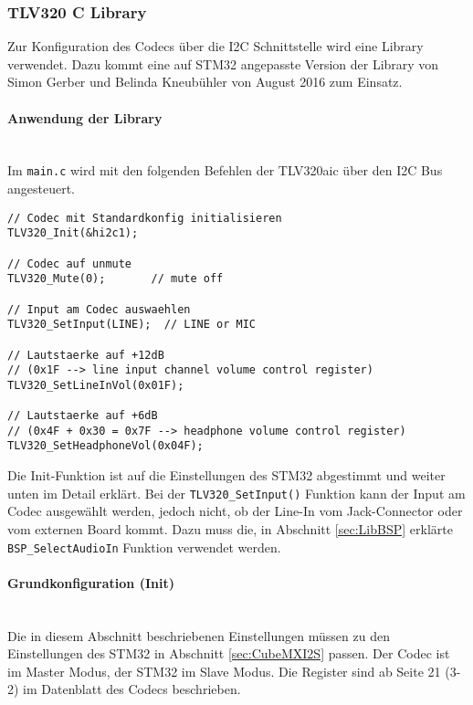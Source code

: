 \subsubsection{TLV320 C Library}
\label{sec:Library_tlv320}

Zur Konfiguration des Codecs über die I2C Schnittstelle wird eine Library verwendet.
Dazu kommt eine auf STM32 angepasste Version der Library von Simon Gerber und Belinda Kneubühler von August 2016 zum Einsatz. \cite{FHNWtlv320}
\\
\paragraph{Anwendung der Library}\vspace{-0.3cm}\\
Im \texttt{main.c} wird mit den folgenden Befehlen der TLV320aic über den I2C Bus angesteuert.\\

\begin{lstlisting}[style=Cuvision,caption={TLV320 Funktionen}]
// Codec mit Standardkonfig initialisieren
TLV320_Init(&hi2c1);

// Codec auf unmute
TLV320_Mute(0);       // mute off

// Input am Codec auswaehlen
TLV320_SetInput(LINE);  // LINE or MIC

// Lautstaerke auf +12dB  
// (0x1F --> line input channel volume control register)
TLV320_SetLineInVol(0x01F);

// Lautstaerke auf +6dB 
// (0x4F + 0x30 = 0x7F --> headphone volume control register)
TLV320_SetHeadphoneVol(0x04F);

\end{lstlisting}

Die Init-Funktion ist auf die Einstellungen des STM32 abgestimmt und weiter unten im Detail erklärt. 
Bei der \texttt{TLV320\_SetInput()} Funktion kann der Input am Codec ausgewählt werden, jedoch nicht, ob der Line-In vom Jack-Connector oder vom externen Board kommt. 
Dazu muss die, in Abschnitt \ref{sec:LibBSP} erklärte \texttt{BSP\_SelectAudioIn} Funktion verwendet werden.
\\
\paragraph{Grundkonfiguration (Init)}\vspace{-0.3cm}\\
Die in diesem Abschnitt beschriebenen Einstellungen müssen zu den Einstellungen des STM32 in Abschnitt \ref{sec:CubeMXI2S} passen. Der Codec ist im Master Modus, der STM32 im Slave Modus. Die Register sind ab Seite 21 (3-2) im Datenblatt des Codecs beschrieben. \cite{tlv320}

